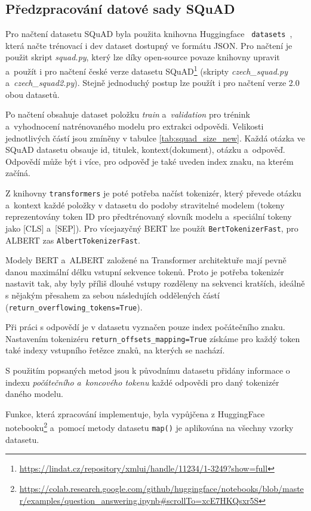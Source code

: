 \subsection{Předzpracování datové sady SQuAD}
Pro načtení datasetu SQuAD byla použita knihovna Huggingface \texttt{ datasets }, která načte trénovací i dev dataset dostupný ve formátu JSON. Pro načtení je použit skript \emph{squad.py}, který lze díky open-source povaze knihovny upravit a~použít i pro načtení české verze datasetu SQuAD\footnote{\url{https://lindat.cz/repository/xmlui/handle/11234/1-3249?show=full}} (skripty \emph{czech\_squad.py} a~\emph{czech\_squad2.py}). Stejně jednoduchý postup lze použít i pro načtení verze 2.0 obou datasetů.\par
Po načtení obsahuje dataset položku \emph{train} a~\emph{validation} pro trénink a~vyhodnocení natrénovaného modelu pro extrakci odpovědi. Velikosti jednotlivých částí jsou zmíněny v tabulce \ref{tab:squad_size_new}. Každá otázka ve SQuAD datasetu obsauje id, titulek, kontext(dokument), otázku a~odpověď. Odpovědí může být i více, pro odpověď je také uveden index znaku, na kterém začíná.\par
Z knihovny \texttt{transformers} je poté potřeba načíst tokenizér, který převede otázku a~kontext každé položky v datasetu do podoby stravitelné modelem (tokeny reprezentovány token ID pro předtrénovaný slovník modelu a~speciální tokeny jako [CLS] a~[SEP]). Pro více\-jazyčný BERT lze použít \texttt{BertTokenizerFast}, pro ALBERT zas \texttt{AlbertTokenizerFast}.\par
Modely BERT a~ALBERT založené na Transformer architektuře mají pevně danou maximální délku vstupní sekvence tokenů. Proto je potřeba tokenizér nastavit tak, aby byly příliš dlouhé vstupy rozděleny na sekvenci kratších, ideálně s nějakým přesahem za sebou následujích oddělených částí (\texttt{return\_overflowing\_tokens=True}).\par
Při práci s odpovědí je v datasetu vyznačen pouze index počátečního znaku. Nastavením tokenizéru \texttt{return\_offsets\_mapping=True} získáme pro každý token také indexy vstupního řetězce znaků, na kterých se nachází.\par
S použitím popsaných metod jsou k původnímu datasetu přidány informace o indexu \emph{počátečního a~koncového tokenu} každé odpovědi pro daný tokenizér daného modelu.\par 
Funkce, která zpracování implementuje, byla vypůjčena z HuggingFace notebooku\footnote{\url{https://colab.research.google.com/github/huggingface/notebooks/blob/master/examples/question\_answering.ipynb\#scrollTo=xcE7HKQsxr5S}} a~pomocí metody datasetu \texttt{map()} je aplikována na všechny vzorky datasetu.

